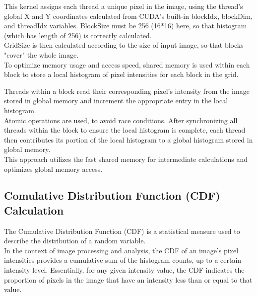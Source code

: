 \documentclass[10pt]{article}
\begin{document}
\vspace{1cm}

This kernel assigns each thread a unique pixel in the image, using the thread's global X and Y coordinates calculated from CUDA's built-in blockIdx, blockDim, and threadIdx variables.
BlockSize must be 256 (16*16) here, so that histogram (which has length of 256) is correctly calculated.\\  
GridSize is then calculated according to the size of input image, so that blocks "cover" the whole image.\\
To optimize memory usage and access speed, shared memory is used within each block to store a local histogram of pixel intensities for each block in the grid.\\

\pagebreak

Threads within a block read their corresponding pixel's intensity from the image stored in global memory and increment the appropriate entry in the local histogram.\\
Atomic operations are used, to avoid race conditions. After synchronizing all threads within the block to ensure the local histogram is complete, each thread then contributes its portion of the local histogram to a global histogram stored in global memory.\\
This approach utilizes the fast shared memory for intermediate calculations and optimizes global memory access. 

\vspace{0.5cm}

\subsection{Comulative Distribution Function (CDF) Calculation}
\vspace{0.3cm}

The Cumulative Distribution Function (CDF) is a statistical measure used to describe the distribution of a random variable. \\
In the context of image processing and analysis, the CDF of an image's pixel intensities provides a cumulative sum of the histogram counts, up to a certain intensity level. Essentially, for any given intensity value, the CDF indicates the proportion of pixels in the image that have an intensity less than or equal to that value. \\
\end{document}
